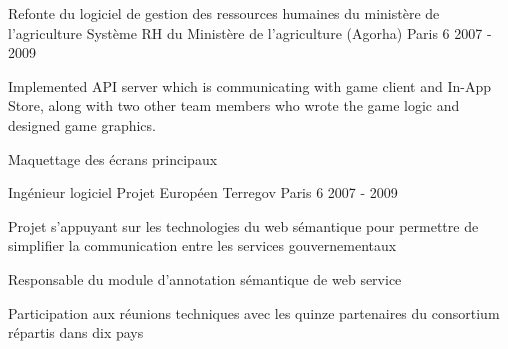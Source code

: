 \begin{cventries}



\end{cventries}



\begin{cventries}
  \cventry
    {Refonte du logiciel de gestion des ressources humaines du ministère de l'agriculture} %
    {Système RH du Ministère de l'agriculture (Agorha)} %
    {Paris 6} %
    {2007 - 2009} %
    {
      \begin{cvitems} %
        \item {Implemented API server which is communicating with game client and In-App Store, along with two other team members who wrote the game logic and designed game graphics.}
        \item {Maquettage des écrans principaux}
      \end{cvitems}
    }
\end{cventries}

\begin{cventries}
  \cventry
    {Ingénieur logiciel} %
    {Projet Européen Terregov} %
    {Paris 6} %
    {2007 - 2009} %
    {
      \begin{cvitems} %
        \item {Projet s'appuyant sur les technologies du web sémantique pour permettre de simplifier la communication entre les services gouvernementaux}
        \item {Responsable du module d'annotation sémantique de web service}
        \item {Participation aux réunions techniques avec les quinze partenaires du consortium répartis dans dix pays}
      \end{cvitems}
    }

\end{cventries}
